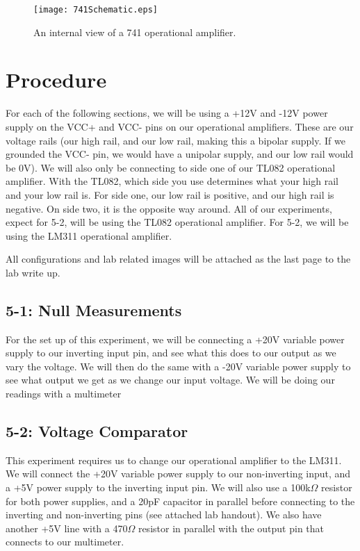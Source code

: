 \documentclass[%
 aip,
 jmp,
 amsmath,
 amssymb,
 reprint,%
 numerical,
 longbibliography,
]{revtex4-1}
\begin{document}
\begin{figure}[H]
\texttt{[image: 741Schematic.eps]}
\caption{\label{fig1}An internal view of a 741 operational amplifier.}
\end{figure}


\section{Procedure}

For each of the following sections, we will be using a +12V and -12V power supply on the VCC+
and VCC- pins on our operational amplifiers. These are our voltage rails (our high rail, and our low rail,
making this a bipolar supply. If we grounded the VCC- pin, we would have a unipolar supply, and our low rail
would be 0V). We will also only be connecting to side one of our TL082 operational amplifier. With the TL082,
which side you use determines what your high rail and your low rail is. For side one, our low rail is positive,
and our high rail is negative. On side two, it is the opposite way around. All of our experiments, expect for 5-2,
will be using the TL082 operational amplifier. For 5-2, we will be using the LM311 operational amplifier.

All configurations and lab related images will be attached as the last page to the lab write up.

	\subsection{5-1: Null Measurements}
	
	For the set up of this experiment, we will be connecting a +20V variable power supply to our inverting input pin,
	and see what this does to our output as we vary the voltage. We will then do the same with a -20V variable
	power supply to see what output we get as we change our input voltage. We will be doing our readings with a multimeter
	
	\subsection{5-2: Voltage Comparator}
	
	This experiment requires us to change our operational amplifier to the LM311. We will connect the +20V variable power supply
	to our non-inverting input, and a +5V power supply to the inverting input pin. We will also use a 100k$\Omega$ resistor for both
	power supplies, and a 20pF capacitor in parallel before connecting to the inverting and non-inverting pins (see attached lab 
	handout). We also have another +5V line with a 470$\Omega$ resistor in parallel with the output pin that connects to our multimeter.
	
\end{document}
